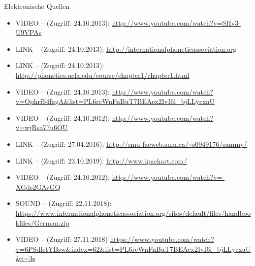 \begin{frame}[allowframebreaks]{Elektronische Quellen}

	\footnotesize
	
	\begin{itemize}
	
		\item VIDEO --  (Zugriff: 24.10.2013): \url{http://www.youtube.com/watch?v=SHv3-U9VPAs}

		\item LINK --  (Zugriff: 24.10.2013): \url{http://internationalphoneticassociation.org}

		\item LINK --  (Zugriff: 24.10.2013):
		\url{http://phonetics.ucla.edu/course/chapter1/chapter1.html}
		
		\item VIDEO --  (Zugriff: 24.10.2013): \url{http://www.youtube.com/watch?v=Ophrf64fxgA&list=PL6rcWnFnBuT7BEAex2IvI6l_bjLLycxaU}

		\item VIDEO --  (Zugriff: 24.10.2012): \url{http://www.youtube.com/watch?v=wjRsa77u6OU}

		\item LINK --  (Zugriff: 27.04.2016): \url{http://smu-facweb.smu.ca/~s0949176/sammy/}
		
		\item LINK --  (Zugriff: 23.10.2019):
		\url{http://www.ipachart.com/}

		\item VIDEO --  (Zugriff: 24.10.2012): \url{http://www.youtube.com/watch?v=-XGds2GAvGQ}
		
		\item SOUND --  (Zugriff: 22.11.2018):
		\url{https://www.internationalphoneticassociation.org/sites/default/files/handbookfiles/German.zip}
		
		\item VIDEO --  (Zugriff: 27.11.2018)
		\url{https://www.youtube.com/watch?v=6PSdlctYBsw&index=62&list=PL6rcWnFnBuT7BEAex2IvI6l_bjLLycxaU&t=3s}
	\end{itemize}
	
\end{frame}

